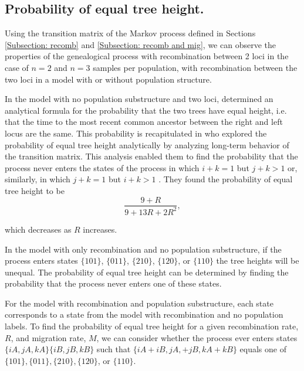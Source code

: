 \documentclass[11pt,oneside]{amsart}
\begin{document}

\subsection{Probability of equal tree height.}
\label{subsection: pequal tree height}

Using the transition matrix of the Markov process defined in Sections \ref{Subsection: recomb} and \ref{Subsection: recomb and mig}, we can observe the properties of the genealogical process with recombination between 2 loci in the case of $n = 2$ and $n = 3$ samples per population, with recombination between the two loci in a model with or without population structure.

In the model with no population substructure and two loci, \cite{Griffiths1981} determined an analytical formula for the probability that the two trees have equal height, i.e. that the time to the most recent common ancestor between the right and left locus are the same. This probability is recapitulated in \cite{SimonsenChurchill1997} who explored the probability of equal tree height analytically by analyzing long-term behavior of the transition matrix. This analysis enabled them to find the probability that the process never enters the states of the process in which $i + k = 1$ but $j + k > 1$ or, similarly, in which $j + k = 1$ but $i + k > 1$ . They found the probability of equal tree height to be 
\begin{equation}
\frac{9+R}{9+13R + 2R^2},
\label{Eqn: equal tree height}
\end{equation}

which decreases as $R$ increases.

In the model with only recombination and no population substructure, if the process enters states $\{101\}$, $\{011\}$, $\{210\}$, $\{120\}$, or $\{110\}$ the tree heights will be unequal. The probability of equal tree height can be determined by finding the probability that the process never enters one of these states. %

For the model with recombination and population substructure, each state corresponds to a state from the model with recombination and no population labels. To find the probability of equal tree height for a given recombination rate, $R$, and migration rate, $M$, we can consider whether the process ever enters states $\{iA, jA, kA\}\{iB, jB, kB \}$ such that $\{iA + iB, jA, + jB, kA + kB \}$ equals one of $\{101\}, \{011\}, \{210\}, \{120\}$, or $\{110\}$. 
\end{document}
